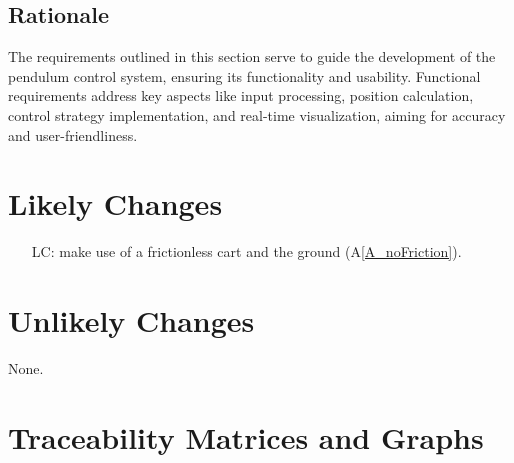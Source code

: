 \documentclass[12pt]{article}
\newcommand{\aref}[1]{A\ref{#1}}
\newcounter{lcnum} %
\begin{document}
\subsection{Rationale}

The requirements outlined in this section serve to guide 
the development of the pendulum control system, ensuring 
its functionality and usability. Functional requirements 
address key aspects like input processing, position calculation, 
control strategy implementation, and real-time visualization, 
aiming for accuracy and user-friendliness. 


\section{Likely Changes} \label{sec:likely_changes}

\noindent \begin{itemize}

\item[LC\refstepcounter{lcnum}\thelcnum\label{LC_friction}:]
    \progname{} make use of a frictionless cart and the ground (\aref{A_noFriction}).

\end{itemize}

\section{Unlikely Changes} \label{sec:unlikely_changes}

None.




\section{Traceability Matrices and Graphs} \label{sec:trace}
\end{document}
